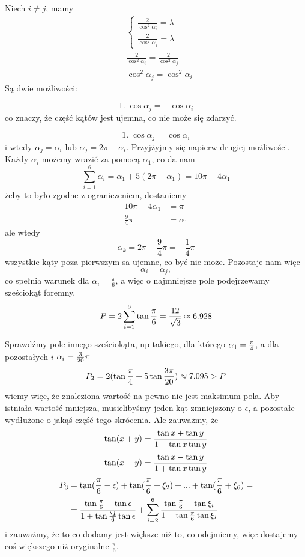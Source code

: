 \documentclass{article}[13pt]
\begin{document}
        Niech $i\neq j$, mamy
        \begin{align*}
            &\begin{cases}
                \frac2{\cos^2 \alpha_i}=\lambda\\
                \frac2{\cos^2 \alpha_j}=\lambda
            \end{cases}\\
            &\frac2{\cos^2 \alpha_i}=\frac2{\cos^2 \alpha_j}\\
            &\cos^2 \alpha_j=\cos^2 \alpha_i
        \end{align*}
        Są dwie możliwości:

        $$1.\;\cos\alpha_j=-\cos\alpha_i$$
        co znaczy, że część kątów jest ujemna, co nie może się zdarzyć.

        $$1.\;\cos\alpha_j=\cos\alpha_i$$
        i wtedy $\alpha_j=\alpha_i$ lub $\alpha_j=2\pi-\alpha_i$. Przyjżyjmy się napierw drugiej możliwości. Każdy $\alpha_i$ możemy wrazić za pomocą $\alpha_1$, co da nam
        $$\sum\limits_{i=1}^6\alpha_i=\alpha_1+5(2\pi-\alpha_1)=10\pi-4\alpha_1$$
        żeby to było zgodne z ograniczeniem, dostaniemy
        \begin{align*}
            10\pi-4\alpha_1&=\pi\\
            \frac94\pi&=\alpha_1
        \end{align*}
        ale wtedy
        $$\alpha_k=2\pi-\frac94\pi=-\frac14\pi$$
        wszystkie kąty poza pierwszym sa ujemne, co być nie może. Pozostaje nam więc 
        $$\alpha_i=\alpha_j,$$
        co spełnia warunek dla $\alpha_i=\frac\pi6$, a więc o najmniejsze pole podejrzewamy sześciokąt foremny.
        $$P=2\sum\limits_{i=1}^6\tan{\pi\over6}={12\over\sqrt{3}}\approx 6.928$$
        
        Sprawdźmy pole innego sześciokąta, np takiego, dla którego $\alpha_1={\pi\over4}$, a dla pozostałych $i$ $\alpha_i={3\over 20}\pi$
        $$P_2=2(\tan{\pi\over4}+5\tan{3\pi\over 20})\approx7.095>P$$
        wiemy więc, że znaleziona wartość na pewno nie jest maksimum pola. Aby istniała wartość mniejsza, musielibyśmy jeden kąt zmniejszony o $\epsilon$, a pozostałe wydłużone o jakąś część tego skrócenia. Ale zauważmy, że
        $$\tan(x+y)={\tan x+\tan y\over 1-\tan x\tan y}$$
        $$\tan(x-y)={\tan x - \tan y\over 1+\tan x\tan y}$$
        \begin{align*}
            P_3&=\tan(\frac\pi6-\epsilon)+\tan(\frac\pi6+\xi_2)+...+\tan(\frac\pi6+\xi_6)=\\
            &={\tan\frac\pi6-\tan\epsilon\over 1+\tan\frac\i6\tan\epsilon}+\sum\limits_{i=2}^6{\tan\frac\pi6+\tan\xi_i\over1-\tan\frac\pi6\tan\xi_i}
        \end{align*}
        i zauważmy, że to co dodamy jest większe niż to, co odejmiemy, więc dostajemy coś większego niż oryginalne $\frac\pi6$.
        
\end{document}
